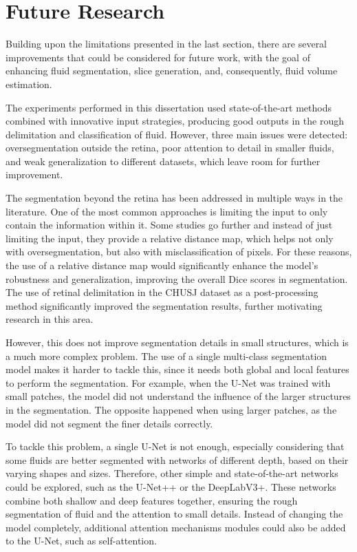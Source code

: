 \section{Future Research}

Building upon the limitations presented in the last section, there are several improvements that could be considered for future work, with the goal of enhancing fluid segmentation, slice generation, and, consequently, fluid volume estimation.
\par
The experiments performed in this dissertation used state-of-the-art methods combined with innovative input strategies, producing good outputs in the rough delimitation and classification of fluid. However, three main issues were detected: oversegmentation outside the retina, poor attention to detail in smaller fluids, and weak generalization to different datasets, which leave room for further improvement.
\par
The segmentation beyond the retina has been addressed in multiple ways in the literature. One of the most common approaches is limiting the input to only contain the information within it. Some studies go further and instead of just limiting the input, they provide a relative distance map, which helps not only with oversegmentation, but also with misclassification of pixels. For these reasons, the use of a relative distance map would significantly enhance the model's robustness and generalization, improving the overall Dice scores in segmentation. The use of retinal delimitation in the CHUSJ dataset as a post-processing method significantly improved the segmentation results, further motivating research in this area.
\par
However, this does not improve segmentation details in small structures, which is a much more complex problem. The use of a single multi-class segmentation model makes it harder to tackle this, since it needs both global and local features to perform the segmentation. For example, when the U-Net was trained with small patches, the model did not understand the influence of the larger structures in the segmentation. The opposite happened when using larger patches, as the model did not segment the finer details correctly.
\par
To tackle this problem, a single U-Net is not enough, especially considering that some fluids are better segmented with networks of different depth, based on their varying shapes and sizes. Therefore, other simple and state-of-the-art networks could be explored, such as the U-Net++ or the DeepLabV3+. These networks combine both shallow and deep features together, ensuring the rough segmentation of fluid and the attention to small details. Instead of changing the model completely, additional attention mechanisms modules could also be added to the U-Net, such as self-attention.
